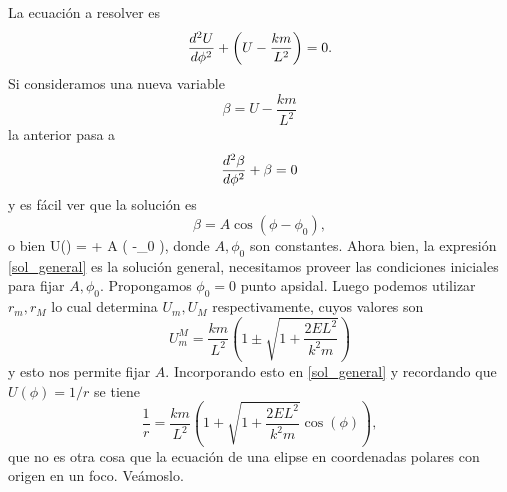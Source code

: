 \documentclass[10pt,oneside]{CBFT_book}
\begin{document}
La ecuación a resolver es 
\[
	\dtot[2]{U}{\phi} + \left( U  - \frac{k m}{L^2} \right) = 0.
\]
Si consideramos una nueva variable 
\[
	\beta = U  - \frac{k m}{L^2}
\]
la anterior pasa a 
\[
	\dtot[2]{\beta}{\phi} + \beta = 0
\]
y es fácil ver que la solución es
\[
	\beta = A \cos( \phi -\phi_0 ),
\]
o bien 
\be
	U(\phi) =  +  A \cos( \phi -\phi_0 ),
	\label{sol_general}
\ee
donde $A,\phi_0$ son constantes. Ahora bien, la expresión \eqref{sol_general} es la solución general,
necesitamos proveer las condiciones iniciales para fijar $ A, \phi_0 $. Propongamos $ \phi_0 = 0 $
punto apsidal.
Luego podemos utilizar $r_m, r_M$ lo cual determina $U_m, U_M$ respectivamente, cuyos valores son 
\[
	U^M_m = \frac{km}{L^2} \left( 1 \pm \sqrt{1 + \frac{2EL^2}{k^2 m} }\right)
\]
y esto nos permite fijar $A$. Incorporando esto en \eqref{sol_general} y recordando que $U(\phi) =1/r$ 
se tiene 
\[
	\frac{1}{r} = \frac{km}{L^2}\left( 1 +  \sqrt{1 + \frac{2EL^2}{k^2 m} } \cos( \phi ) \right),
\]
que no es otra cosa que la ecuación de una elipse en coordenadas polares con origen en un foco.
Veámoslo.

\end{document}
